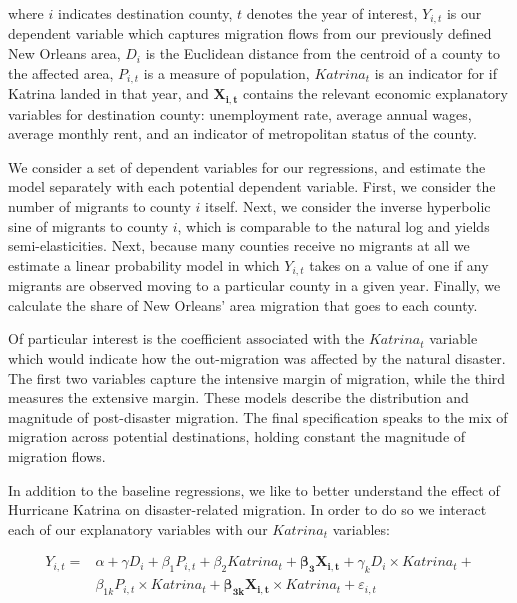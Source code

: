 \documentclass[]{article}
\begin{document}
where \(i\) indicates destination county, \(t\) denotes the year of
interest, \(Y_{i,t}\) is our dependent variable which captures migration
flows from our previously defined New Orleans area, \({D}_{i}\) is the
Euclidean distance from the centroid of a county to the affected area,
\({P}_{i,t}\) is a measure of population, \({Katrina}_{t}\) is an
indicator for if Katrina landed in that year, and \(\mathbf{X_{i,t}}\)
contains the relevant economic explanatory variables for destination
county: unemployment rate, average annual wages, average monthly rent,
and an indicator of metropolitan status of the county.

We consider a set of dependent variables for our regressions, and
estimate the model separately with each potential dependent variable.
First, we consider the number of migrants to county \(i\) itself. Next,
we consider the inverse hyperbolic sine of migrants to county \(i\),
which is comparable to the natural log and yields semi-elasticities.
Next, because many counties receive no migrants at all we estimate a
linear probability model in which \(Y_{i,t}\) takes on a value of one if
any migrants are observed moving to a particular county in a given year.
Finally, we calculate the share of New Orleans' area migration that goes
to each county.

Of particular interest is the coefficient associated with the
\({Katrina}_{t}\) variable which would indicate how the out-migration
was affected by the natural disaster. The first two variables capture
the intensive margin of migration, while the third measures the
extensive margin. These models describe the distribution and magnitude
of post-disaster migration. The final specification speaks to the mix of
migration across potential destinations, holding constant the magnitude
of migration flows.

In addition to the baseline regressions, we like to better understand
the effect of Hurricane Katrina on disaster-related migration. In order
to do so we interact each of our explanatory variables with our
\({Katrina}_{t}\) variables:

\begin{equation} \label{eq:intreg}
\begin{split}
Y_{i,t} = &\alpha + \gamma {D}_{i} + \beta_1 {P}_{i,t} + \beta_2 {Katrina}_{t} + \mathbf{\beta_3} \mathbf{X_{i,t}} + \gamma_k {D}_{i} \times {Katrina}_{t} + \\
& \beta_{1k} {P}_{i,t} \times {Katrina}_{t} + \mathbf{\beta_{3k}} \mathbf{X_{i,t}} \times {Katrina}_{t} + \varepsilon_{i,t} 
\end{split}
\end{equation}
\end{document}
